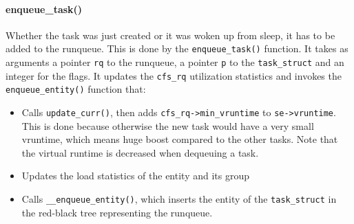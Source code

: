 \paragraph{enqueue\_task()}
Whether the task was just created or it was woken up from sleep, it has to be added to the runqueue. This is done by the \verb|enqueue_task()| function. It takes as arguments a pointer \verb|rq| to the runqueue, a pointer \verb|p| to the \verb|task_struct| and an integer for the flags. It updates the \verb|cfs_rq| utilization statistics and invokes the \verb|enqueue_entity()| function that:
\begin{itemize}
    \item Calls \verb|update_curr()|, then adds \verb|cfs_rq->min_vruntime| to \verb|se->vruntime|. This is done because otherwise the new task would have a very small vruntime, which means huge boost compared to the other tasks. Note that the virtual runtime is decreased when dequeuing a task.
    \item Updates the load statistics of the entity and its group
    \item Calls \verb|__enqueue_entity()|, which inserts the entity of the \verb|task_struct| in the red-black tree representing the runqueue.
\end{itemize}
